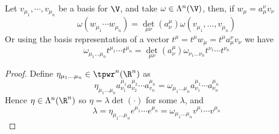 \documentclass[../mmf.tex]{subfiles}
\begin{document}
\begin{thm}
	Let $v_{\mu_1},\cdots,v_{\mu_n}$ be a basis for $\V$, and take $\omega\in\Lambda^n(\V)$, then, if $w_\mu=a_\mu^\nu v_\nu$
	\begin{equation}
		\omega(w_{\mu_1}\cdots w_{\mu_n})=\det_{\mu\nu}(a^\mu_\nu)\omega(v_{\mu_1},\ldots,v_{\mu_n})
		\label{eq:determinant1}
	\end{equation}
	Or using the basis representation of a vector $t^\mu=t^\mu w_\mu=t^\mu a_\mu^\nu v_\nu$ we have
	\begin{equation}
		\omega_{\mu_1\ldots\mu_n}t^{\mu_1}\cdots t^{\mu_n}=\det_{\mu\nu}(a^\mu_\nu)\omega_{\nu_1\ldots\nu_n}t^{\nu_1}\cdots t^{\nu_n}
		\label{eq:determinant2}
	\end{equation}
\end{thm}
\begin{proof}
	Define $\eta_{\mu_1\ldots\mu_n}\in\tpwr^n(\R^n)$ as
	\begin{equation*}
	\eta_{\mu_1\ldots\mu_n}a^{\mu_1}_{\nu_1}a^{\mu_2}_{\nu_2}\cdots a^{\mu_n}_{v_n}=\omega_{\mu_1\ldots\mu_n}a^{\mu_1}_{\nu_1}\cdots a^{\mu_n}_{\nu_n}
	\end{equation*}
	Hence $\eta\in\Lambda^n(\R^n)$ so $\eta=\lambda\det(\cdot)$ for some $\lambda$, and
	\begin{equation*}
		\lambda=\eta_{\mu_1\ldots\mu_n}e^{\mu_1}\cdots e^{\mu_n}=\omega_{\mu_1\ldots\mu_n}v^{\mu_1}\cdots v^{\mu_n}
	\end{equation*}
\end{proof}
\end{document}
